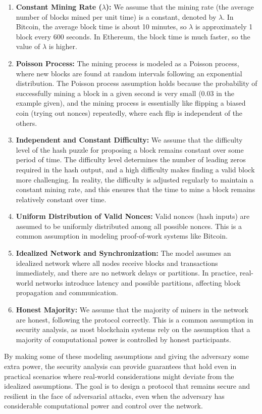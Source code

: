 \begin{enumerate}
    \item \textbf{Constant Mining Rate ($\lambda$):} We assume that the mining rate (the average number of blocks mined per unit time) is a constant, denoted by  $\lambda$. In Bitcoin, the average block time is about 10 minutes, so  $\lambda$ is approximately 1 block every 600 seconds. In Ethereum, the block time is much faster, so the value of  $\lambda$ is higher.
    \item \textbf{Poisson Process:} The mining process is modeled as a Poisson process, where new blocks are found at random intervals following an exponential distribution. The Poisson process assumption holds because the probability of successfully mining a block in a given second is very small (0.03 in the example given), and the mining process is essentially like flipping a biased coin (trying out nonces) repeatedly, where each flip is independent of the others.
    \item \textbf{Independent and Constant Difficulty:} We assume that the difficulty level of the hash puzzle for proposing a block remains constant over some period of time. The difficulty level determines the number of leading zeros required in the hash output, and a high difficulty makes finding a valid block more challenging. In reality, the difficulty is adjusted regularly to maintain a constant mining rate, and this ensures that the time to mine a block remains relatively constant over time.
    \item \textbf{Uniform Distribution of Valid Nonces:} Valid nonces (hash inputs) are assumed to be uniformly distributed among all possible nonces. This is a common assumption in modeling proof-of-work systems like Bitcoin.
    \item \textbf{Idealized Network and Synchronization:} The model assumes an idealized network where all nodes receive blocks and transactions immediately, and there are no network delays or partitions. In practice, real-world networks introduce latency and possible partitions, affecting block propagation and communication.
    \item \textbf{Honest Majority:}  We assume that the majority of miners in the network are honest, following the protocol correctly. This is a common assumption in security analysis, as most blockchain systems rely on the assumption that a majority of computational power is controlled by honest participants.
\end{enumerate}
By making some of these modeling assumptions and giving the adversary some extra power, the security analysis can provide guarantees that hold even in practical scenarios where real-world considerations might deviate from the idealized assumptions. The goal is to design a protocol that remains secure and resilient in the face of adversarial attacks, even when the adversary has considerable computational power and control over the network.

